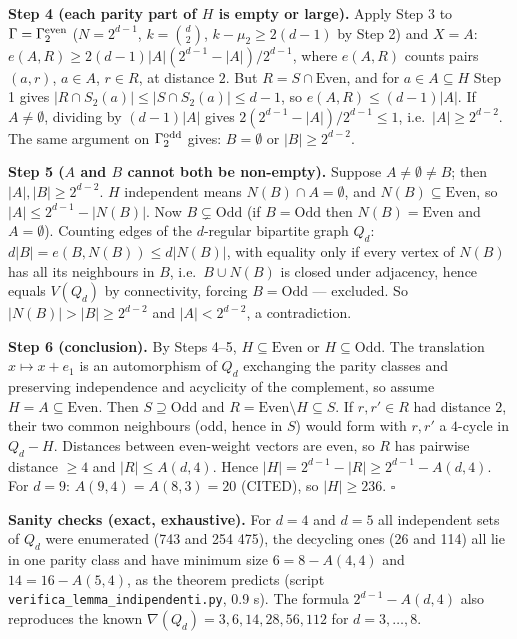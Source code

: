 \textbf{Step 4 (each parity part of \(H\) is empty or large).} Apply
Step 3 to \(\Gamma=\Gamma_2^{\rm even}\) (\(N=2^{d-1}\),
\(k=\binom d2\), \(k-\mu_2\ge2(d-1)\) by Step 2) and \(X=A\):
\(e(A,R)\ge 2(d-1)|A|(2^{d-1}-|A|)/2^{d-1}\), where \(e(A,R)\) counts
pairs \((a,r)\), \(a\in A\), \(r\in R\), at distance \(2\). But
\(R=S\cap\text{Even}\), and for \(a\in A\subseteq H\) Step 1 gives
\(|R\cap S_2(a)|\le|S\cap S_2(a)|\le d-1\), so \(e(A,R)\le(d-1)|A|\). If
\(A\neq\emptyset\), dividing by \((d-1)|A|\) gives
\(2(2^{d-1}-|A|)/2^{d-1}\le1\), i.e.~\(|A|\ge2^{d-2}\). The same
argument on \(\Gamma_2^{\rm odd}\) gives: \(B=\emptyset\) or
\(|B|\ge2^{d-2}\).

\textbf{Step 5 (\(A\) and \(B\) cannot both be non-empty).} Suppose
\(A\ne\emptyset\ne B\); then \(|A|,|B|\ge2^{d-2}\). \(H\) independent
means \(N(B)\cap A=\emptyset\), and \(N(B)\subseteq\text{Even}\), so
\(|A|\le2^{d-1}-|N(B)|\). Now \(B\subsetneq\text{Odd}\) (if
\(B=\text{Odd}\) then \(N(B)=\text{Even}\) and \(A=\emptyset\)).
Counting edges of the \(d\)-regular bipartite graph \(Q_d\):
\(d|B|=e(B,N(B))\le d|N(B)|\), with equality only if every vertex of
\(N(B)\) has all its neighbours in \(B\), i.e.~\(B\cup N(B)\) is closed
under adjacency, hence equals \(V(Q_d)\) by connectivity, forcing
\(B=\text{Odd}\) --- excluded. So \(|N(B)|>|B|\ge2^{d-2}\) and
\(|A|<2^{d-2}\), a contradiction.

\textbf{Step 6 (conclusion).} By Steps 4--5, \(H\subseteq\text{Even}\)
or \(H\subseteq\text{Odd}\). The translation \(x\mapsto x+e_1\) is an
automorphism of \(Q_d\) exchanging the parity classes and preserving
independence and acyclicity of the complement, so assume
\(H=A\subseteq\text{Even}\). Then \(S\supseteq\text{Odd}\) and
\(R=\text{Even}\setminus H\subseteq S\). If \(r,r'\in R\) had distance
\(2\), their two common neighbours (odd, hence in \(S\)) would form with
\(r,r'\) a \(4\)-cycle in \(Q_d-H\). Distances between even-weight
vectors are even, so \(R\) has pairwise distance \(\ge4\) and
\(|R|\le A(d,4)\). Hence \(|H|=2^{d-1}-|R|\ge2^{d-1}-A(d,4)\). For
\(d=9\): \(A(9,4)=A(8,3)=20\) (CITED), so \(|H|\ge236\). \(\square\)

\textbf{Sanity checks (exact, exhaustive).} For \(d=4\) and \(d=5\) all
independent sets of \(Q_d\) were enumerated (743 and 254 475), the
decycling ones (26 and 114) all lie in one parity class and have minimum
size \(6=8-A(4,4)\) and \(14=16-A(5,4)\), as the theorem predicts
(script \texttt{verifica\_lemma\_indipendenti.py}, 0.9 s). The formula
\(2^{d-1}-A(d,4)\) also reproduces the known
\(\nabla(Q_d)=3,6,14,28,56,112\) for \(d=3,\dots,8\).

